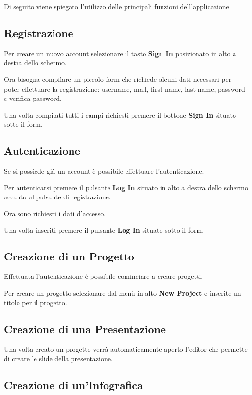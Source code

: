 Di seguito viene spiegato l'utilizzo delle principali funzioni dell'applicazione
\subsection{Registrazione}
Per creare un nuovo account selezionare il tasto \textbf{Sign In} posizionato in alto a destra dello schermo.

\noindent Ora bisogna compilare un piccolo form che richiede alcuni dati necessari per poter effettuare la registrazione: username, mail, first name, last name, password e verifica password.


\noindent Una volta compilati tutti i campi richiesti premere il bottone \textbf{Sign In} situato sotto il form.

\subsection{Autenticazione}
Se si possiede già un account è possibile effettuare l'autenticazione.

\noindent Per autenticarsi premere il pulsante \textbf{Log In} situato in alto a destra dello schermo accanto al pulsante di registrazione.

\noindent Ora sono richiesti i dati d'accesso.

\noindent Una volta inseriti premere il pulsante \textbf{Log In} situato sotto il form.

\subsection{Creazione di un Progetto}

Effettuata l'autenticazione è possibile cominciare a creare progetti.


\noindent Per creare un progetto selezionare dal menù in alto \textbf{New Project} e inserite un titolo per il progetto.



\subsection{Creazione di una Presentazione}

Una volta creato un progetto verrà automaticamente aperto l'editor che permette di creare le slide della presentazione.

\subsection{Creazione di un'Infografica}


